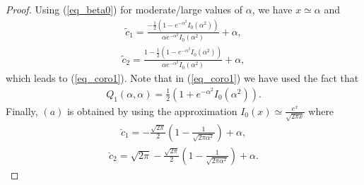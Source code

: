 \begin{proof}
Using (\ref{eq_beta0}) for moderate/large values of $\alpha$, we have $x \simeq \alpha$ and
\begin{align}
        \tilde{c}_1 = \frac{-\frac{1}{2}\left(1-e^{-\alpha^2}I_0(\alpha^2)\right)}{\alpha e^{-\alpha^2}I_0(\alpha^2)}+\alpha,
\end{align}
\begin{align}
     \tilde{c}_2 = \frac{1-\frac{1}{2}\left(1-e^{-\alpha^2}I_0(\alpha^2)\right)}{\alpha e^{-\alpha^2}I_0(\alpha^2)}+\alpha,
\end{align}
which leads to (\ref{eq_coro1}). Note that in (\ref{eq_coro1}) we have used the fact that \cite[Eq.  (A-3-2)]{schwartz1995communication}
\begin{align}
    Q_1(\alpha,\alpha) = \frac{1}{2}\left(1+e^{-\alpha^2}I_0(\alpha^2)\right).
\end{align}
Finally, $(a)$ is obtained by using the approximation $I_0(x) \simeq \frac{e^x}{\sqrt{2\pi x}}$ where
\begin{align}\label{eq_dotc1}
        \breve{c}_1 = -\frac{\sqrt{2\pi}}{2}\left(1-\frac{1}{\sqrt{2\pi\alpha^2}}\right)+\alpha,
\end{align}
\begin{align}\label{eq_dotc2}
     \breve{c}_2 = \sqrt{2\pi}-\frac{\sqrt{2\pi}}{2}\left(1-\frac{1}{\sqrt{2\pi\alpha^2}}\right)+\alpha.
\end{align}
\end{proof}


